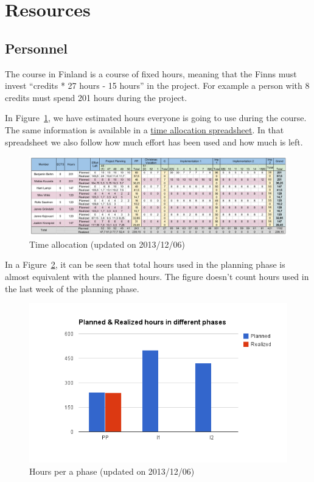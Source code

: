 \section{Resources}
\subsection{Personnel}

The course in Finland is a course of fixed hours, meaning that the
Finns must invest ``credits * 27 hours - 15 hours'' in the project. For example
a person with 8 credits must spend 201 hours during the project.

In Figure~\ref{fig:timeallocation}, we have estimated hours everyone is going to
use during the course. The same information is available in a
\href{https://docs.google.com/spreadsheet/ccc?key=0Ahu59q_GwtcedHI3MnJQM0NWZS11aGxFTzFZeVEyQVE&usp=sharing}{time allocation spreadsheet}. In that spreadsheet we
also follow how much effort has been used and how much is left.

\begin{figure}[H]
\centering
\includegraphics[width=1\textwidth]{imgs/timeallocation.png}
\caption{Time allocation (updated on 2013/12/06)}
\label{fig:timeallocation}
\end{figure}

In a Figure~\ref{fig:hours_phases}, it can be seen that total hours used in the
planning phase is almost equivalent with the planned hours. The figure doesn't
count hours used in the last week of the planning phase.

\begin{figure}[H]
\centering
\includegraphics[width=1\textwidth]{imgs/chart_1.png}
\caption{Hours per a phase (updated on 2013/12/06)}
\label{fig:hours_phases}
\end{figure}

